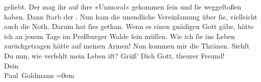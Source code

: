 \begin{ledgroupsized}[t]{13cm}
               geliebt. Der mag ihr auf ihre »Unmoral« gekommen ſein und ſie weggeſtoßen {\pb}haben. Dann ſtarb der \label{K_L02628-2v}\label{K_L02628-2h}.
               Nun kam die unendliche Vereinſamung über ſie, vielleicht auch die Noth. Darum hat
               ſies gethan.\pend
           \pstart
           Wenn es einen gnädigen Gott gäbe, hätte ich an jenem Tage im Preßburger Walde ſein müſſen. Wie ich ſie ins Leben
               zurückgetragen hätte auf meinen Armen!\pend
           \pstart
           Nun kommen mir die Thränen.\pend
           \pstart
           Siehſt Du nun, wie verfehlt mein Leben iſt?\pend
           \pstart
           Grüß’ Dich Gott, theurer Freund!{\\[\baselineskip]}Dein{\\[\baselineskip]}\spacefill\mbox{Paul Goldmann}\pend
           \leftskip=0em{}
         
         \endnumbering{}\end{ledgroupsized}  \newcommand{\dateiname}{L02628}\newcommand{\titel}{Paul Goldmann an Arthur Schnitzler, 18. 12. [1894]}\newcommand{\editorInnen}{Martin Anton Müller und Laura Untner}
      